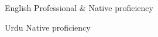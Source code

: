 
\begin{cvskills}

  \cvskill
    {English} %
    {Professional \& Native proficiency} %

  \cvskill
    {Urdu} %
    {Native proficiency} %
    
\end{cvskills}
